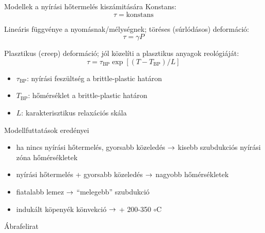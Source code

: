 \begin{frame}{Modellek a nyírási hőtermelés kiszámitására}
    Konstans:
    \[
        \tau = \text{konstans}
    \]

    Lineáris függvénye a nyomásnak/mélységnek; töréses (súrlódásos) deformáció:
    \[
        \tau = \gamma P
    \]
    
    
    Plasztikus (creep) deformáció; jól közelíti a plasztikus anyagok reológiáját:
    \[
        \tau = \tau_{\text{BP}} \exp{[(T - T_{\text{BP}}) / L]}
    \]
    
    \begin{itemize}
        \item $\tau_{\text{BP}}$: nyírási feszültség a brittle-plastic határon
        \item $T_{\text{BP}}$: hőmérséklet a brittle-plastic határon
        \item $L$: karakterisztikus relaxációs skála
    \end{itemize}
\end{frame}


\begin{frame}{Modellfuttatások eredényei}
    \begin{minipage}[c]{0.65\textwidth}
        \centering
        \begin{itemize}
            \item ha nincs nyírási hőtermelés, gyorsabb közeledés $\rightarrow$ kisebb szubdukciós nyírási zóna hőmérsékletek
        \end{itemize}
    \end{minipage}
    \begin{minipage}[c]{0.3\textwidth}
        \begin{itemize}
            \item nyírási hőtermelés + gyorsabb közeledés $\rightarrow$ nagyobb hőmérsékletek
            \item fiatalabb lemez $\rightarrow$ ``melegebb'' szubdukció
            \item indukált köpenyék könvekció $\rightarrow$ + 200-350 $\circ$C
        \end{itemize}
    \end{minipage}
\end{frame}

\begin{frame}{Ábrafelirat}
    \begin{minic}{0.95}
    \end{minic}
\end{frame}

